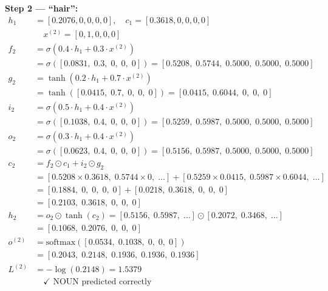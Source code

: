 \textbf{Step 2 --- ``hair'':}
\begin{align*}
    h_1 &= [0.2076,0,0,0,0], \quad c_1 = [0.3618,0,0,0,0] \\
    &\quad x^{(2)} = [0,1,0,0,0] \\[4pt]
    f_2 &= \sigma(0.4 \cdot h_1 + 0.3 \cdot x^{(2)}) \\
         &= \sigma([0.0831,\;0.3,\;0,\;0,\;0])
         = [0.5208,\;0.5744,\;0.5000,\;0.5000,\;0.5000] \\[4pt]
    g_2 &= \tanh(0.2 \cdot h_1 + 0.7 \cdot x^{(2)}) \\
         &= \tanh([0.0415,\;0.7,\;0,\;0,\;0])
         = [0.0415,\;0.6044,\;0,\;0,\;0] \\[4pt]
    i_2 &= \sigma(0.5 \cdot h_1 + 0.4 \cdot x^{(2)}) \\
         &= \sigma([0.1038,\;0.4,\;0,\;0,\;0])
         = [0.5259,\;0.5987,\;0.5000,\;0.5000,\;0.5000] \\[4pt]
    o_2 &= \sigma(0.3 \cdot h_1 + 0.4 \cdot x^{(2)}) \\
         &= \sigma([0.0623,\;0.4,\;0,\;0,\;0])
         = [0.5156,\;0.5987,\;0.5000,\;0.5000,\;0.5000] \\[4pt]
    c_2 &= f_2 \odot c_1 + i_2 \odot g_2 \\
        &= [0.5208 \times 0.3618,\;0.5744\times 0,\;\ldots]
         + [0.5259 \times 0.0415,\;0.5987 \times 0.6044,\;\ldots] \\
        &= [0.1884,\;0,\;0,\;0,\;0] + [0.0218,\;0.3618,\;0,\;0,\;0] \\
        &= [0.2103,\;0.3618,\;0,\;0,\;0] \\[4pt]
    h_2 &= o_2 \odot \tanh(c_2)
         = [0.5156,\;0.5987,\;\ldots] \odot [0.2072,\;0.3468,\;\ldots] \\
         &= [0.1068,\;0.2076,\;0,\;0,\;0] \\[4pt]
    o^{(2)} &= \text{softmax}([0.0534,\;0.1038,\;0,\;0,\;0]) \\
             &= [0.2043,\;0.2148,\;0.1936,\;0.1936,\;0.1936] \\
    L^{(2)} &= -\log(0.2148) = 1.5379 \\
    &\quad \checkmark \text{ NOUN predicted correctly}
\end{align*}

